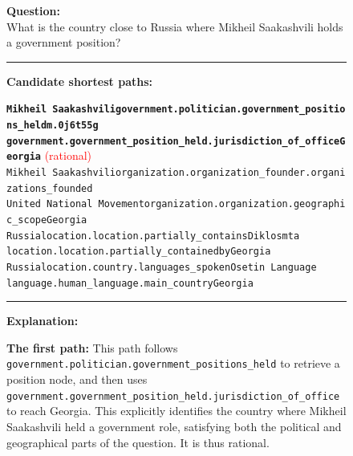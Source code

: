 \begin{figure}[t]
\begin{tcolorbox}[colback=gray!5!white,
                  colframe=gray!75!black,
                  title=WebQTrn-1399\_64fc62dc06d16e612aafb00889d4ada1]
\scriptsize

\textbf{Question:}\\
What is the country close to Russia where Mikheil Saakashvili holds a government position?

\rule{\linewidth}{0.4pt}

\textbf{Candidate shortest paths:}\\[2pt]
{\raggedright
\texttt{\textbf{Mikheil Saakashvili\patharrow government.politician.government\_positions\_held\patharrow m.0j6t55g \\ \patharrow government.government\_position\_held.jurisdiction\_of\_office\patharrow Georgia}}\hfill
\textcolor{red}{(rational)}\\[6pt]

\texttt{Mikheil Saakashvili\patharrow organization.organization\_founder.organizations\_founded \\ \patharrow United National Movement\patharrow organization.organization.geographic\_scope\patharrow Georgia}\\[6pt]

\texttt{Russia\patharrow location.location.partially\_contains\patharrow Diklosmta \\ \patharrow location.location.partially\_containedby\patharrow Georgia}\\[6pt]

\texttt{Russia\patharrow location.country.languages\_spoken\patharrow Osetin Language \\ \patharrow language.human\_language.main\_country\patharrow Georgia}\\[6pt]

\par}

\rule{\linewidth}{0.4pt}

\textbf{Explanation:}\\[2pt]
{\raggedright
\textbf{The first path:} This path follows \texttt{government.politician.government\_positions\_held} to retrieve a position node, and then uses \texttt{government.government\_position\_held.jurisdiction\_of\_office} to reach Georgia. This explicitly identifies the country where Mikheil Saakashvili held a government role, satisfying both the political and geographical parts of the question. It is thus rational.\par\vspace{6pt}

}
\end{tcolorbox}
\end{figure}
